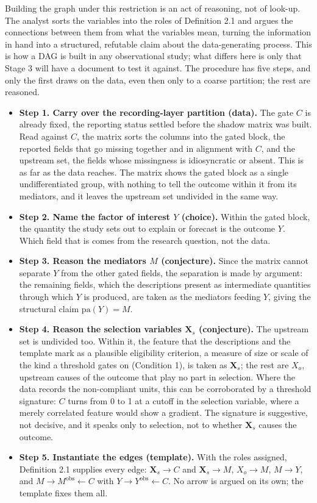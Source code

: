 Building the graph under this restriction is an act of reasoning, not of look-up. The analyst sorts the variables into the roles of Definition 2.1 and argues the connections between them from what the variables mean, turning the information in hand into a structured, refutable claim about the data-generating process. This is how a DAG is built in any observational study; what differs here is only that Stage 3 will have a document to test it against. The procedure has five steps, and only the first draws on the data, even then only to a coarse partition; the rest are reasoned.

\begin{itemize}
  \item \textbf{Step 1. Carry over the recording-layer partition (data).} The gate $C$ is already fixed, the reporting status settled before the shadow matrix was built. Read against $C$, the matrix sorts the columns into the gated block, the reported fields that go missing together and in alignment with $C$, and the upstream set, the fields whose missingness is idiosyncratic or absent. This is as far as the data reaches. The matrix shows the gated block as a single undifferentiated group, with nothing to tell the outcome within it from its mediators, and it leaves the upstream set undivided in the same way.
  \item \textbf{Step 2. Name the factor of interest $Y$ (choice).} Within the gated block, the quantity the study sets out to explain or forecast is the outcome $Y$. Which field that is comes from the research question, not the data.
  \item \textbf{Step 3. Reason the mediators $M$ (conjecture).} Since the matrix cannot separate $Y$ from the other gated fields, the separation is made by argument: the remaining fields, which the descriptions present as intermediate quantities through which $Y$ is produced, are taken as the mediators feeding $Y$, giving the structural claim $\mathrm{pa}(Y) = M$.
  \item \textbf{Step 4. Reason the selection variables $\mathbf{X}_s$ (conjecture).} The upstream set is undivided too. Within it, the feature that the descriptions and the template mark as a plausible eligibility criterion, a measure of size or scale of the kind a threshold gates on (Condition 1), is taken as $\mathbf{X}_s$; the rest are $X_o$, upstream causes of the outcome that play no part in selection. Where the data records the non-compliant units, this can be corroborated by a threshold signature: $C$ turns from 0 to 1 at a cutoff in the selection variable, where a merely correlated feature would show a gradient. The signature is suggestive, not decisive, and it speaks only to selection, not to whether $\mathbf{X}_s$ causes the outcome.
  \item \textbf{Step 5. Instantiate the edges (template).} With the roles assigned, Definition 2.1 supplies every edge: $\mathbf{X}_s \to C$ and $\mathbf{X}_s \to M$, $X_o \to M$, $M \to Y$, and $M \to M^{\text{obs}} \leftarrow C$ with $Y \to Y^{\text{obs}} \leftarrow C$. No arrow is argued on its own; the template fixes them all.
\end{itemize}

